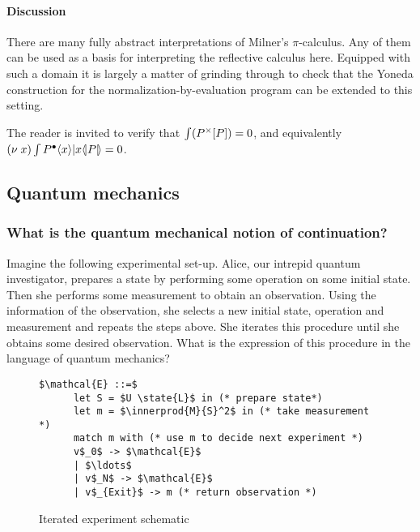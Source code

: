 \paragraph{Discussion}
There are many fully abstract interpretations of Milner's
$\pi$-calculus. Any of them can be used as a basis for interpreting
the reflective calculus here. Equipped with such a domain it is
largely a matter of grinding through to check that the Yoneda
construction for the normalization-by-evaluation program can be
extended to this setting.

\begin{remark}
  The reader is invited to verify that $\int (P^{\times}[P]) = 0$,
  and equivalently $(\nu\; x)\int P^{\bullet}\langle x \rangle |
  x\langle\!| P |\!\rangle = 0$.
\end{remark}

\subsection{Quantum mechanics}

\subsubsection{What is the quantum mechanical notion of continuation?}\label{sec:quantum_continuation}

Imagine the following experimental set-up. Alice, our intrepid quantum
investigator, prepares a state by performing some operation on some
initial state. Then she performs some measurement to obtain an
observation. Using the information of the observation, she selects a
new initial state, operation and measurement and repeats the steps
above. She iterates this procedure until she obtains some desired
observation. What is the expression of this procedure in the language
of quantum mechanics?

\begin{figure}[htp]\label{fig:iterated_experiment}
    \begin{lstlisting}[mathescape]
      $\mathcal{E} ::=$
      let S = $U \state{L}$ in (* prepare state*)
      let m = $\innerprod{M}{S}^2$ in (* take measurement *)
      match m with (* use m to decide next experiment *)
      v$_0$ -> $\mathcal{E}$
      | $\ldots$
      | v$_N$ -> $\mathcal{E}$
      | v$_{Exit}$ -> m (* return observation *)
    \end{lstlisting}
  \caption{Iterated experiment schematic}
\end{figure}

